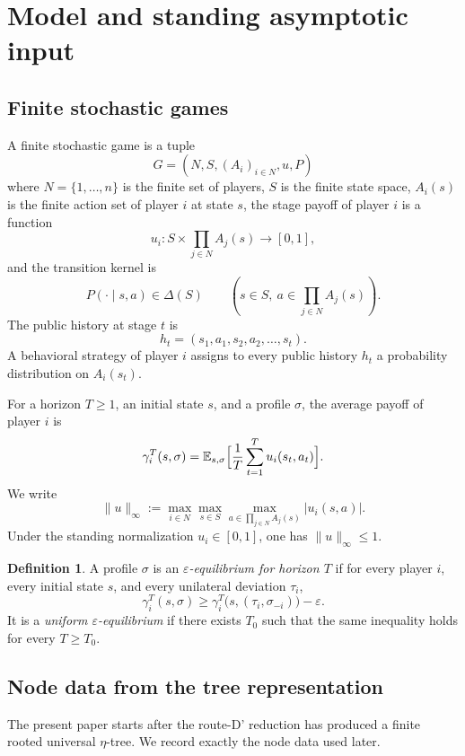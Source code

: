\documentclass[12pt]{article}
\theoremstyle{definition}
\newtheorem{definition}[theorem]{Definition}
\newcommand{\eps}{\varepsilon}
\newcommand{\E}{\mathbb{E}}
\newcommand{\1}{\mathbf{1}}
\begin{document}
\section{Model and standing asymptotic input}
\label{sec:model}

\subsection{Finite stochastic games}

A finite stochastic game is a tuple
\[
G=(N,S,(A_i)_{i\in N},u,P)
\]
where $N=\{1,\dots,n\}$ is the finite set of players, $S$ is the finite state
space, $A_i(s)$ is the finite action set of player $i$ at state $s$, the stage
payoff of player $i$ is a function
\[
u_i:S\times \prod_{j\in N}A_j(s)\to [0,1],
\]
and the transition kernel is
\[
P(\cdot\mid s,a)\in \Delta(S)
\qquad (s\in S,\ a\in \prod_{j\in N}A_j(s)).
\]
The public history at stage $t$ is
\[
h_t=(s_1,a_1,s_2,a_2,\dots,s_t).
\]
A behavioral strategy of player $i$ assigns to every public history $h_t$ a
probability distribution on $A_i(s_t)$.

For a horizon $T\ge 1$, an initial state $s$, and a profile $\sigma$, the average
payoff of player $i$ is
\[
\gamma_i^T(s,\sigma)
=
\E_{s,\sigma}\Bigl[\frac1T\sum_{t=1}^T u_i(s_t,a_t)\Bigr].
\]
We write
\[
\|u\|_\infty
:=
\max_{i\in N}\max_{s\in S}\max_{a\in\prod_{j\in N}A_j(s)} |u_i(s,a)|.
\]
Under the standing normalization $u_i\in[0,1]$, one has $\|u\|_\infty\le 1$.

\begin{definition}
A profile $\sigma$ is an \emph{$\eps$-equilibrium for horizon $T$} if for every
player $i$, every initial state $s$, and every unilateral deviation $\tau_i$,
\[
\gamma_i^T(s,\sigma)
\ge
\gamma_i^T\bigl(s,(\tau_i,\sigma_{-i})\bigr)-\eps.
\]
It is a \emph{uniform $\eps$-equilibrium} if there exists $T_0$ such that the same
inequality holds for every $T\ge T_0$.
\end{definition}

\subsection{Node data from the tree representation}

The present paper starts after the route-D' reduction has produced a finite rooted
universal $\eta$-tree. We record exactly the node data used later.
\end{document}
